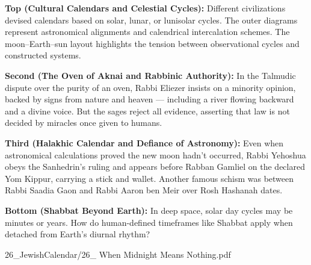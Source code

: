 \begin{SideNotePage}{

    \textbf{Top (Cultural Calendars and Celestial Cycles):}  
    Different civilizations devised calendars based on solar, lunar, or lunisolar cycles. The outer diagrams represent astronomical alignments and calendrical intercalation schemes. The moon–Earth–sun layout highlights the tension between observational cycles and constructed systems. \par
  
    \textbf{Second (The Oven of Aknai and Rabbinic Authority):}  
    In the Talmudic dispute over the purity of an oven, Rabbi Eliezer insists on a minority opinion, backed by signs from nature and heaven — including a river flowing backward and a divine voice. But the sages reject all evidence, asserting that law is not decided by miracles once given to humans. \par
  
    \textbf{Third (Halakhic Calendar and Defiance of Astronomy):}  
    Even when astronomical calculations proved the new moon hadn’t occurred, Rabbi Yehoshua obeys the Sanhedrin’s ruling and appears before Rabban Gamliel on the declared Yom Kippur, carrying a stick and wallet. Another famous schism was between Rabbi Saadia Gaon and Rabbi Aaron ben Meir over Rosh Hashanah dates. \par
  
    \textbf{Bottom (Shabbat Beyond Earth):}  
    In deep space, solar day cycles may be minutes or years. How do human-defined timeframes like Shabbat apply when detached from Earth's diurnal rhythm? \par
  
}{26_JewishCalendar/26_ When Midnight Means Nothing.pdf}
\end{SideNotePage}
